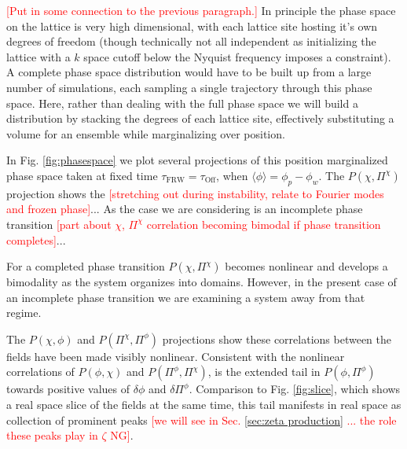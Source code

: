 
\textcolor{red}{[Put in some connection to the previous paragraph.]}
In principle the phase space on the lattice is very high dimensional, with each lattice site hosting it's own degrees of freedom (though technically not all independent as initializing the lattice with a $k$ space cutoff below the Nyquist frequency imposes a constraint). A complete phase space distribution would have to be built up from a large number of simulations, each sampling a single trajectory through this phase space. Here, rather than dealing with the full phase space we will build a distribution by stacking the degrees of each lattice site, effectively substituting a volume for an ensemble while marginalizing over position.

In Fig. \ref{fig:phasespace} we plot several projections of this position marginalized phase space taken at fixed time $\tau_\mathrm{FRW} = \tau_\mathrm{Off}$, when $\langle\phi\rangle = \phi_p - \phi_w$. The $P(\chi,\Pi^\chi)$ projection shows the \textcolor{red}{[stretching out during instability, relate to Fourier modes and frozen phase]}... As the case we are considering is an incomplete phase transition \textcolor{red}{[part about $\chi$, $\Pi^\chi$ correlation becoming bimodal if phase transition completes]}...

For a completed phase transition $P(\chi,\Pi^\chi)$ becomes nonlinear and develops a bimodality as the system organizes into domains. However, in the present case of an incomplete phase transition we are examining a system away from that regime.

The $P(\chi,\phi)$ and $P(\Pi^\chi,\Pi^\phi)$ projections show these correlations between the fields have been made visibly nonlinear. Consistent with the nonlinear correlations of $P(\phi,\chi)$ and $P(\Pi^\phi,\Pi^\chi)$, is the extended tail in $P(\phi,\Pi^\phi)$ towards positive values of $\delta\phi$ and $\delta\Pi^\phi$. Comparison to Fig. \ref{fig:slice}, which shows a real space slice of the fields at the same time, this tail manifests in real space as collection of prominent peaks \textcolor{red}{[we will see in Sec. \ref{sec:zeta production} ... the role these peaks play in $\zeta$ NG]}. 


